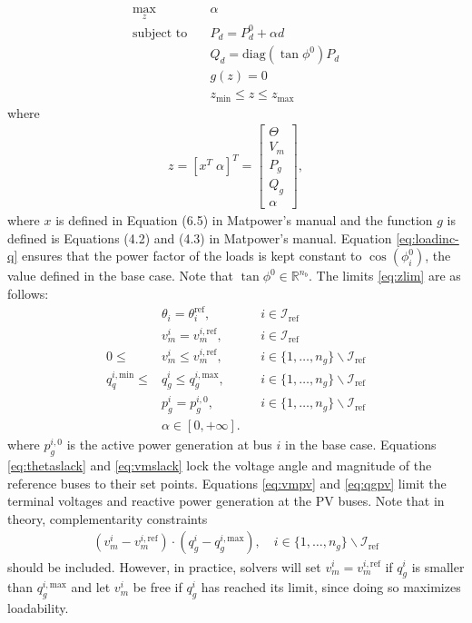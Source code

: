 \documentclass[12pt,a4]{article}
\newcommand*{\field}[1]{\mathbb{#1}}
\newcommand*{\R}{\field{R}} %
\newcommand*{\matpower}{{\sc Matpower}}
\begin{document}
\begin{subequations}\label{eq:maxll}
\begin{align}
  \max_{z} \quad & \alpha \label{eq:maxll-obj} \\
  \text{subject to} \quad & P_d = P_d^0 + \alpha d \label{eq:loadinc}\\
   & Q_d = \text{diag}(\tan \phi^0) P_d \label{eq:loadinc-q}\\
   & g(z) = 0 \\
   & z_\text{min} \leq z \leq z_\text{max} \label{eq:zlim}
\end{align}  
\end{subequations}
where
\begin{align}
  \label{eq:z}
  z = [x^T \; \alpha]^T =  \begin{bmatrix}
    \Theta \\
    V_m \\
    P_g \\
    Q_g \\
    \alpha
  \end{bmatrix},
\end{align}
where $x$ is defined in Equation (6.5) in \matpower's manual and the function $g$ is defined is Equations (4.2) and (4.3) in \matpower's manual.
Equation \eqref{eq:loadinc-q} ensures that the power factor of the loads is kept constant to $\cos(\phi_i^0)$, the value defined in the base case.
Note that $\tan \phi^0 \in \R^{n_b}$.
The limits \eqref{eq:zlim} are as follows:
\begin{align}
  & \theta_i = \theta_i^\text{ref}, && i \in \mathcal{I}_\text{ref} \label{eq:thetaslack} \\
  & v_m^{i} = v_m^{i,\text{ref}}, && i \in \mathcal{I}_\text{ref} \label{eq:vmslack} \\
  0 \leq & v_m^{i} \leq v_m^{i,\text{ref}}, && i \in \{1,\ldots,n_g\} \backslash \mathcal{I}_\text{ref} \label{eq:vmpv} \\
  q_q^{i,\text{min}} \leq & q_g^i \leq q_g^{i,\text{max}}, && i \in \{1,\ldots,n_g\} \backslash \mathcal{I}_\text{ref} \label{eq:qgpv}\\
  & p_g^i = p_g^{i,0}, && i \in \{1,\ldots,n_g\} \backslash \mathcal{I}_\text{ref} \\
  & \alpha \in [0,+\infty].
\end{align}
where $p_g^{i,0}$ is the active power generation at bus $i$ in the base case.
Equations \eqref{eq:thetaslack} and \eqref{eq:vmslack} lock the voltage angle and magnitude of the reference buses to their set points.
Equations \eqref{eq:vmpv} and \eqref{eq:qgpv} limit the terminal voltages and reactive power generation at the PV buses. 
Note that in theory, complementarity constraints
\begin{align}
  \label{eq:comp-constr}
  (v_m^i-v_m^{i,\text{ref}})\cdot(q_g^i-q_g^{i,\text{max}}), \quad i \in \{1,\ldots,n_g\} \backslash \mathcal{I}_\text{ref}
\end{align}
should be included. 
However, in practice, solvers will set $v_m^i = v_m^{i,\text{ref}}$ if $q_g^i$ is smaller than $q_g^{i,\text{max}}$ and let $v_m^i$ be free if $q_g^i$ has reached its limit, since doing so maximizes loadability.
\end{document}
